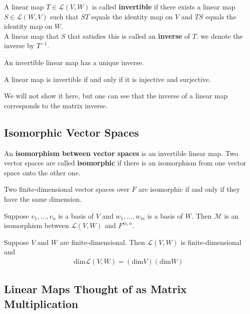 \documentclass{memoir}
\begin{document}
\begin{defn}
	A linear map $T \in \mathcal{L}(V,W)$ is called \textbf{invertible} if there exists a linear map $S \in \mathcal{L}(W,V)$ such that $ST$ equals the identity map on $V$ and $TS$ equals the identity map on $W$. \\

	A linear map that $S$ that satisfies this is called an \textbf{inverse} of $T$. we denote the inverse by $T^{-1}$.
\end{defn}
\begin{lemma}
	An invertible linear map has a unique inverse.
\end{lemma}
\begin{thm}
	A linear map is invertible if and only if it is injective and surjective.
\end{thm}

We will not show it here, but one can see that the inverse of a linear map corresponds to the matrix inverse.
\subsection{Isomorphic Vector Spaces}
\label{sec:isomorphic_vector_spaces}

\begin{defn}
	An \textbf{isomorphism between vector spaces} is an invertible linear map. Two vector spaces are called \textbf{isomorphic} if there is an isomorphism from one vector space onto the other one.
\end{defn}
\begin{lemma}
	Two finite-dimensional vector spaces over $F$ are isomorphic if and only if they have the same dimension.
\end{lemma}
\begin{cor}
	Suppose $v_1,\ldots,v_n$ is a basis of $V$ and $w_1,\ldots,w_m$ is a basis of $W$. Then $\mathcal{M}$ is an isomorphism between $\mathcal{L}(V,W)$ and $F^{m,n}$.
\end{cor}
\begin{cor}
	Suppose $V$ and $W$ are finite-dimensional. Then $\mathcal{L}(V,W)$ is finite-dimensional and
	\begin{align*}
		\textrm{dim}\mathcal{L}(V,W) = ( \textrm{dim}V) ( \textrm{dim}W)	
	\end{align*}
\end{cor}
\subsection{Linear Maps Thought of as Matrix Multiplication}
\label{sec:linear_maps_thought_of_as_matrix_multiplication}
\end{document}
